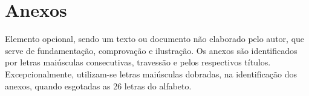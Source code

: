 \chapter{Anexos}
\label{cap:anexos}

Elemento opcional, sendo um texto ou documento não elaborado pelo autor, que serve de fundamentação, comprovação e ilustração. Os anexos são identificados por letras maiúsculas consecutivas, travessão e pelos respectivos títulos. Excepcionalmente, utilizam-se letras maiúsculas dobradas, na identificação dos anexos, quando esgotadas as 26 letras do alfabeto.